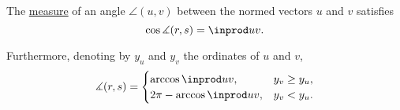 \begin{proposition}\label{thm:cosine_of_angle_measure}
  The \hyperref[def:angle/measure]{measure} of an angle \( \angle(u, v) \) between the normed vectors \( u \) and \( v \) satisfies
  \begin{equation}\label{eq:thm:cosine_of_angle_measure/cos}
    \cos \measuredangle(r, s) = \inprod u v.
  \end{equation}

  Furthermore, denoting by \( y_u \) and \( y_v \) the ordinates of \( u \) and \( v \),
  \begin{equation}\label{eq:thm:cosine_of_angle_measure/arccos}
    \measuredangle(r, s) = \begin{cases}
      \arccos \inprod u v,        &y_v \geq y_u, \\
      2\pi - \arccos \inprod u v, &y_v < y_u.
    \end{cases}
  \end{equation}
\end{proposition}
